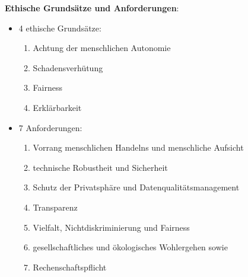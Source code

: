 \textbf{Ethische Grundsätze und Anforderungen}:
\begin{itemize}
	\item 4 ethische Grundsätze:
	\begin{enumerate}
		\item Achtung der menschlichen Autonomie
		\item Schadensverhütung
		\item Fairness
		\item Erklärbarkeit
	\end{enumerate}
	\item 7 Anforderungen:
	\begin{enumerate}
		\item Vorrang menschlichen Handelns und menschliche Aufsicht
		\item technische Robustheit und Sicherheit
		\item Schutz der Privatsphäre und Datenqualitätsmanagement
		\item Transparenz
		\item Vielfalt, Nichtdiskriminierung und Fairness
		\item gesellschaftliches und ökologisches Wohlergehen sowie
		\item Rechenschaftspflicht
	\end{enumerate}
\end{itemize}
